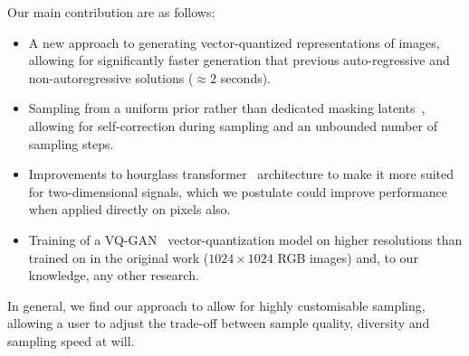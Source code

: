 Our main contribution are as follows:
\begin{itemize}
    \item A new approach to generating vector-quantized representations of
        images, allowing for significantly faster generation that previous
        auto-regressive and non-autoregressive solutions ($\approx 2$ seconds).
    \item Sampling from a uniform prior rather than dedicated masking
        latents~\cite{bondtaylor2021unleashing,austin2021structured},
        allowing for self-correction during sampling and an unbounded number of
        sampling steps.
    \item Improvements to hourglass transformer~\cite{nawrot2021hierarchical}
        architecture to make it more suited for two-dimensional signals, which
        we postulate could improve performance when applied directly on pixels
        also.
    \item Training of a VQ-GAN~\cite{esser2021taming} vector-quantization model
        on higher resolutions than trained on in the original work ($1024 \times
        1024$ RGB images) and, to our knowledge, any other research.
\end{itemize}

In general, we find our approach to allow for highly customisable sampling,
allowing a user to adjust the trade-off between sample quality, diversity and
sampling speed at will.

